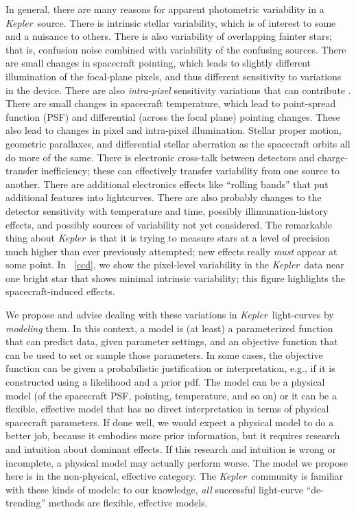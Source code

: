 \documentclass[12pt, preprint]{aastex}
\newcommand{\project}[1]{\textsl{#1}}
\newcommand{\Kepler}{\project{Kepler}}
\begin{document}
In general, there are many reasons for apparent photometric variability in a \Kepler\ source.
There is intrinsic stellar variability,
  which is of interest to some and a nuisance to others.
There is also variability of overlapping fainter stars;
  that is, confusion noise combined with variability of the confusing sources.
There are small changes in spacecraft pointing,
  which leads to slightly different illumination of the focal-plane pixels,
  and thus different sensitivity to variations in the device.
There are also \emph{intra-pixel} sensitivity variations that can contribute \citep{whitepaper}.
There are small changes in spacecraft temperature,
  which lead to point-spread function (PSF) and differential (across the focal plane) pointing changes.
These also lead to changes in pixel and intra-pixel illumination.
Stellar proper motion, geometric parallaxes, and differential stellar aberration as the spacecraft orbits all do more of the same.
There is electronic cross-talk between detectors and charge-transfer inefficiency;
  these can effectively transfer variability from one source to another.
There are additional electronics effects like ``rolling bands'' that put additional features into lightcurves.
There are also probably changes to the detector sensitivity with temperature and time,
  possibly illimunation-history effects,
  and possibly sources of variability not yet considered.
The remarkable thing about \Kepler\ is that it is trying to measure stars at a level of precision
  much higher than ever previously attempted;
  new effects really \emph{must} appear at some point.
In \figurename~\ref{ccd}, we show the pixel-level variability in the \Kepler\ data
  near one bright star that shows minimal intrinsic variability;
  this figure highlights the spacecraft-induced effects.

We propose and advise dealing with these variations in \Kepler\ light-curves by \emph{modeling} them.
In this context, a model is (at least) a parameterized function that can predict data, given parameter settings,
  and an objective function that can be used to set or sample those parameters.
In some cases, the objective function can be given a probabilistic justification or interpretation, e.g., if it is constructed using a likelihood and a prior pdf.
The model can be a physical model (of the spacecraft PSF, pointing, temperature, and so on)
  or it can be a flexible, effective model that has no direct interpretation in terms of physical spacecraft parameters.
If done well, we would expect a physical model to do a better job,
  because it embodies more prior information,
  but it requires research and intuition about dominant effects. 
If this research and intuition is wrong or incomplete, a physical model may actually perform worse.
The model we propose here is in the non-physical, effective category.
The \Kepler\ community is familiar with these kinds of models;
  to our knowledge, \emph{all} successful light-curve ``de-trending'' methods
  are flexible, effective models.
\end{document}
